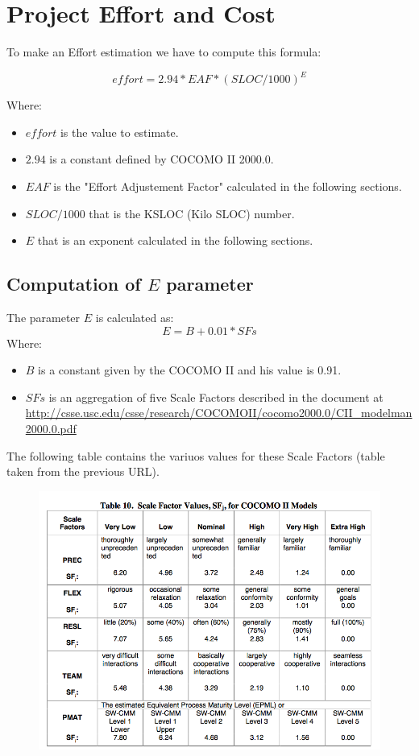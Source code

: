 \documentclass[../../../../projectPlan.tex]{subfiles}
\begin{document}
	\section{Project Effort and Cost}

		To make an Effort estimation we have to compute this formula:

		\[effort = 2.94 * EAF * (SLOC/1000)^E\]

		Where:
		\begin{itemize}
			\item \(effort\) is the value to estimate.
			\item \(2.94\) is a constant defined by COCOMO II 2000.0.
			\item \(EAF\) is the "Effort Adjustement Factor" calculated in the following sections.
			\item \(SLOC/1000\) that is the KSLOC (Kilo SLOC) number.
			\item \(E\) that is an exponent calculated in the following sections.
		\end{itemize}

		\subsection{Computation of \(E\) parameter}
			The parameter \(E\) is calculated as:
			\[E = B + 0.01 * SFs\]
			Where:
			\begin{itemize}
				\item \(B\) is a constant given by the COCOMO II and his value is 0.91.
				\item \(SFs\) is an aggregation of five Scale Factors described in the document at \url{http://csse.usc.edu/csse/research/COCOMOII/cocomo2000.0/CII_modelman2000.0.pdf}
			\end{itemize}
			

			The following table contains the variuos values for these Scale Factors (table taken from the previous URL).

			\begin{figure}[H]
				\centering
				\includegraphics[width=\textwidth, scale=0.5]{../images/ftable.png}
			\end{figure}
\end{document}
